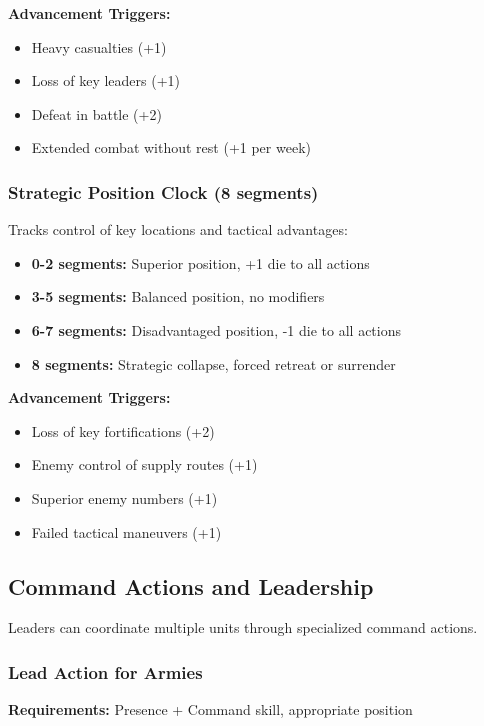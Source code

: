 \documentclass[11pt,letterpaper]{article}
\begin{document}
\textbf{Advancement Triggers:}
\begin{itemize}[leftmargin=*]
    \item Heavy casualties (+1)
    \item Loss of key leaders (+1)
    \item Defeat in battle (+2)
    \item Extended combat without rest (+1 per week)
\end{itemize}

\subsubsection{Strategic Position Clock (8 segments)}

Tracks control of key locations and tactical advantages:
\begin{itemize}[leftmargin=*]
    \item \textbf{0-2 segments:} Superior position, +1 die to all actions
    \item \textbf{3-5 segments:} Balanced position, no modifiers
    \item \textbf{6-7 segments:} Disadvantaged position, -1 die to all actions
    \item \textbf{8 segments:} Strategic collapse, forced retreat or surrender
\end{itemize}

\textbf{Advancement Triggers:}
\begin{itemize}[leftmargin=*]
    \item Loss of key fortifications (+2)
    \item Enemy control of supply routes (+1)
    \item Superior enemy numbers (+1)
    \item Failed tactical maneuvers (+1)
\end{itemize}

\subsection{Command Actions and Leadership}

Leaders can coordinate multiple units through specialized command actions.

\subsubsection{Lead Action for Armies}

\textbf{Requirements:} Presence + Command skill, appropriate position
\end{document}
